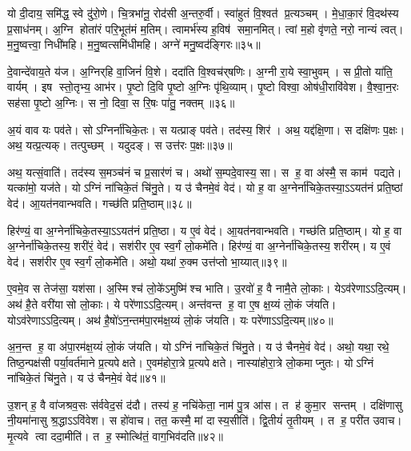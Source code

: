    यो दी॒दाय॒ समि॑द्ध॒ स्वे दु॑रो॒णे।
   चि॒त्रभा॑नू॒ रोद॑सी अ॒न्तरु॒र्वी।
   स्वा॑हुतं वि॒श्वत॑ प्र॒त्यञ्चम्।
   मे॒धा॒का॒रं वि॒दथ॑स्य प्र॒साध॑नम्।
   अ॒ग्नि होता॑रं परि॒भूत॑मं म॒तिम्।
   त्वामर्भ॑स्य ह॒विष॑ समा॒नमित्।
   त्वां म॒हो वृ॑णते॒ नरो॒ नान्यं त्वत्।
   म॒नु॒ष्वत्त्वा॒ निधी॑महि।
   म॒नु॒ष्वत्समि॑धीमहि।
   अग्ने॑ मनु॒ष्वद॑ङ्गिरः॥३५॥

   दे॒वान्दे॑वाय॒ते य॑ज।
   अ॒ग्निर्{‌}हि वा॒जिनं॑ वि॒शे।
   ददा॑ति वि॒श्वच॑र्{‌}षणिः।
   अ॒ग्नी रा॒ये स्वा॒भुवम्।
   स प्री॒तो या॑ति॒ वार्यम्।
   इष स्तो॒तृभ्य॒ आभ॑र।
   पृ॒ष्टो दि॒वि पृ॒ष्टो अ॒ग्निः पृ॑थि॒व्याम्।
   पृ॒ष्टो विश्वा॒ ओष॑धी॒रावि॑वेश।
   वै॒श्वा॒न॒रः सह॑सा पृ॒ष्टो अ॒ग्निः।
   स नो॒ दिवा॒ स रि॒षः पा॑तु॒ नक्तम्॥३६॥
\anuvakamend
  
   अ॒यं वाव यः पव॑ते।
   सोऽग्निर्ना॑चिके॒तः।
   स यत्प्राङ् पव॑ते।
   तद॑स्य॒ शिर॑।
   अथ॒ यद्द॑क्षि॒णा।
   स दक्षि॑णः प॒क्षः।
   अथ॒ यत्प्र॒त्यक्।
   तत्पुच्छम्।
   यदुदङ्{‌}\sG{}।
   स उत्त॑रः प॒क्षः॥३७॥

   अथ॒ यत्सं॒वाति॑।
   तद॑स्य स॒मञ्च॑नं च प्र॒सार॑णं च।
   अथो॑ स॒म्पदे॒वास्य॒ सा।
   स ह॒ वा अ॑स्मै॒ स काम॑ पद्यते।
   यत्का॑मो॒ यज॑ते।
   योऽग्निं ना॑चिके॒तं चि॑नु॒ते।
   य उ॑ चैनमे॒वं वेद॑।
   यो ह॒ वा अ॒ग्नेर्ना॑चिके॒तस्या॒ऽऽयत॑नं प्रति॒ष्ठां वेद॑।
   आ॒यत॑नवान्भवति।
   गच्छ॑ति प्रति॒ष्ठाम्॥३८॥

   हिर॑ण्यं॒ वा अ॒ग्नेर्ना॑चिके॒तस्या॒ऽऽयत॑नं प्रति॒ष्ठा।
   य ए॒वं वेद॑।
   आ॒यत॑नवान्भवति।
   गच्छ॑ति प्रति॒ष्ठाम्।
   यो ह॒ वा अ॒ग्नेर्ना॑चिके॒तस्य॒ शरी॑रं॒ वेद॑।
   सश॑रीर ए॒व स्व॒र्गं लो॒कमे॑ति।
   हिर॑ण्यं॒ वा अ॒ग्नेर्ना॑चिके॒तस्य॒ शरी॑रम्।
   य ए॒वं वेद॑।
   सश॑रीर ए॒व स्व॒र्गं लो॒कमे॑ति।
   अथो॒ यथा॑ रु॒क्म उत्त॑प्तो भा॒य्यात्॥३९॥

   ए॒वमे॒व स तेज॑सा॒ यश॑सा।
   अ॒स्मिश्च॑ लो॒के॑ऽमुष्मि॑श्च भाति।
   उ॒रवो॑ ह॒ वै नामै॒ते लो॒काः।
   येऽव॑रेणाऽऽदि॒त्यम्।
   अथ॑ है॒ते वरी॑यासो लो॒काः।
   ये परे॑णाऽऽदि॒त्यम्।
   अन्त॑वन्त ह॒ वा ए॒ष क्ष॒य्यं लो॒कं ज॑यति।
   योऽव॑रेणाऽऽदि॒त्यम्।
   अथ॑ है॒षो॑ऽन॒न्तम॑पा॒रम॑क्ष॒य्यं लो॒कं ज॑यति।
   यः परे॑णाऽऽदि॒त्यम्॥४०॥
   
   अ॒न॒न्त ह॒ वा अ॑पा॒रम॑क्ष॒य्यं लो॒कं ज॑यति।
   योऽग्निं ना॑चिके॒तं चि॑नु॒ते।
   य उ॑ चैनमे॒वं वेद॑।
   अथो॒ यथा॒ रथे॒ तिष्ठ॒न्पक्ष॑सी पर्या॒वर्त॑माने प्र॒त्यपेक्षते।
   ए॒वम॑होरा॒त्रे प्र॒त्यपेक्षते।
   नास्या॑होरा॒त्रे लो॒कमाप्नुतः।
   योऽग्निं ना॑चिके॒तं चि॑नु॒ते।
   य उ॑ चैनमे॒वं वेद॑॥४१॥
\anuvakamend
  
   उ॒शन् ह॒ वै वा॑जश्रव॒सः स॑र्ववेद॒सं द॑दौ।
   तस्य॑ ह॒ नचि॑केता॒ नाम॑ पु॒त्र आ॑स।
   त ह॑ कुमा॒र सन्तम्।
   दक्षि॑णासु नी॒यमा॑नासु श्र॒द्धाऽऽवि॑वेश।
   स हो॑वाच।
   तत॒ कस्मै॒ मां दास्य॒सीति॑।
   द्वि॒तीयं॑ तृ॒तीयम्।
   त ह॒ परी॑त उवाच।
   मृ॒त्यवे त्वा ददा॒मीति॑।
   त ह॒ स्मोत्थि॑तं॒ वाग॒भिव॑दति॥४२॥

